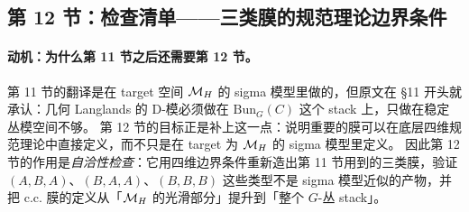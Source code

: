 \subsection{第 12 节：检查清单——三类膜的规范理论边界条件}
\label{subsec:section12}

\paragraph{动机：为什么第 11 节之后还需要第 12 节。}第 11 节的翻译是在 target 空间 \(\mathcal{M}_H\) 的 sigma 模型里做的，但原文在 \S11 开头就承认：几何 Langlands 的 D-模必须做在 \(\mathrm{Bun}_G(C)\) 这个 stack 上，只做在稳定丛模空间不够。\pA{} 第 12 节的目标正是补上这一点：说明重要的膜可以在底层四维规范理论中直接定义，而不只是在 target 为 \(\mathcal{M}_H\) 的 sigma 模型里定义。\pA{} 因此第 12 节的作用是\emph{自洽性检查}：它用四维边界条件重新造出第 11 节用到的三类膜，验证 \((A,B,A)\)、\((B,A,A)\)、\((B,B,B)\) 这些类型不是 sigma 模型近似的产物，并把 c.c. 膜的定义从「\(\mathcal{M}_H\) 的光滑部分」提升到「整个 \(G\)-丛 stack」。\pA{}


